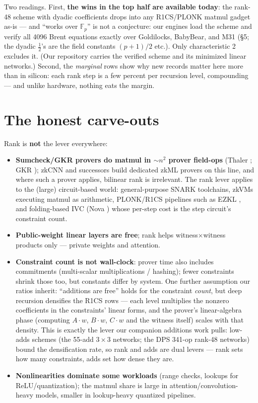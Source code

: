\documentclass[10pt]{article}
\begin{document}
Two readings. First, \textbf{the wins in the top half are available
today}: the rank-48 scheme \cite{alphaevolve,dps} with dyadic
coefficients drops into any R1CS/PLONK matmul gadget as-is --- and
``works over $\mathbb{F}_p$'' is not a conjecture: our engines
load the scheme and verify all 4096 Brent equations exactly over
Goldilocks, BabyBear, and M31 (\S5; the dyadic $\tfrac12$'s are
the field constants $(p{+}1)/2$ etc.). Only characteristic 2
excludes it. (Our repository carries the verified scheme and its
minimized linear networks.) Second, the \emph{marginal} rows show why new records
matter here more than in silicon: each rank step is a few percent per
recursion level, compounding --- and unlike hardware, nothing eats
the margin.

\section{The honest carve-outs}\label{sec:carve}

Rank is \textbf{not} the lever everywhere:

\begin{itemize}
\item \textbf{Sumcheck/GKR provers do matmul in ${\sim}n^2$ prover
  field-ops} (Thaler \cite{thaler}; GKR \cite{gkr}); zkCNN
  \cite{zkcnn} and successors build dedicated zkML provers on this
  line, and where such a prover applies, bilinear rank is irrelevant.
  The rank lever applies to the (large) circuit-based world:
  general-purpose SNARK toolchains, zkVMs executing matmul as
  arithmetic, PLONK/R1CS pipelines such as EZKL \cite{ezkl}, and
  folding-based IVC (Nova \cite{nova}) whose per-step cost is the
  step circuit's constraint count.
\item \textbf{Public-weight linear layers are free}; rank helps
  witness$\times$witness products only --- private weights and
  attention.
\item \textbf{Constraint count is not wall-clock}: prover time also
  includes commitments (multi-scalar multiplications / hashing);
  fewer constraints shrink those too, but constants differ by
  system. One further assumption our ratios inherit: ``additions
  are free'' holds for the constraint \emph{count}, but deep
  recursion densifies the R1CS rows --- each level multiplies the
  nonzero coefficients in the constraints' linear forms, and the
  prover's linear-algebra phase (computing $A\cdot w$, $B\cdot w$,
  $C\cdot w$ and the witness itself) scales with that density.
  This is exactly the lever our companion additions work pulls:
  low-adds schemes (the 55-add $3{\times}3$ networks; the DPS
  341-op rank-48 networks) bound the densification rate, so rank
  and adds are dual levers --- rank sets how many constraints,
  adds set how dense they are.
\item \textbf{Nonlinearities dominate some workloads} (range checks,
  lookups for ReLU/quantization); the matmul share is large in
  attention/convolution-heavy models, smaller in lookup-heavy
  quantized pipelines.
\end{itemize}
\end{document}
